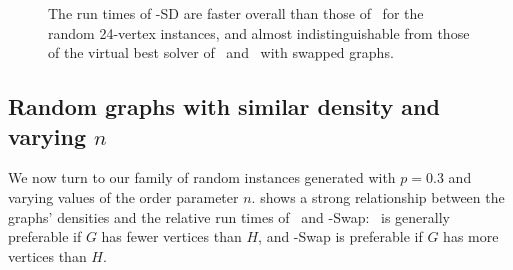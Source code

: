 \begin{figure}[h!]
    \centering
    \caption{The run times of \McSplit-SD are faster overall than those of \McSplit\ for the
        random 24-vertex instances, and almost indistinguishable from those of the virtual
        best solver of \McSplit\ and \McSplit\ with swapped graphs.}
        \label{figure:left-vs-smart-d-mcis}
\end{figure}

\subsection{Random graphs with similar density and varying $n$}

We now turn to our family of random instances generated with $p=0.3$ and varying values of
the order parameter $n$.   shows a strong relationship between
the graphs' densities and the relative run times of \McSplit\ and \McSplit-Swap: \McSplit\
is generally preferable if $G$ has fewer vertices than $H$, and \McSplit-Swap is preferable
if $G$ has more vertices than $H$.

